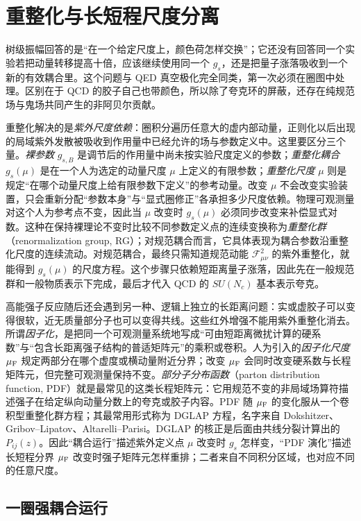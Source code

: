 \section{重整化与长短程尺度分离}\label{sec:qcd-running-ir-dp10}

树级振幅回答的是“在一个给定尺度上，颜色荷怎样交换”；它还没有回答同一个实验若把动量转移提高十倍，应该继续使用同一个 $g_s$，还是把量子涨落吸收到一个新的有效耦合里。这个问题与 QED 真空极化完全同类，第一次必须在圈图中处理。区别在于 QCD 的胶子自己也带颜色，所以除了夸克环的屏蔽，还存在纯规范场与鬼场共同产生的非阿贝尔贡献。

重整化解决的是\emph{紫外尺度依赖}：圈积分遍历任意大的虚内部动量，正则化以后出现的局域紫外发散被吸收到作用量中已经允许的场与参数定义中。这里要区分三个量。\emph{裸参数} $g_{s,B}$ 是调节后的作用量中尚未按实验尺度定义的参数；\emph{重整化耦合} $g_s(\mu)$ 是在一个人为选定的动量尺度 $\mu$ 上定义的有限参数；\emph{重整化尺度} $\mu$ 则是规定“在哪个动量尺度上给有限参数下定义”的参考动量。改变 $\mu$ 不会改变实验装置，只会重新分配“参数本身”与“显式圈修正”各承担多少尺度依赖。物理可观测量对这个人为参考点不变，因此当 $\mu$ 改变时 $g_s(\mu)$ 必须同步改变来补偿显式对数。这种在保持裸理论不变时比较不同参数定义点的连续变换称为\emph{重整化群}（renormalization group, RG）；对规范耦合而言，它具体表现为耦合参数沿重整化尺度的连续流动。对规范耦合，最终只需知道规范动能 $\mathcal F_{\mu\nu}^2$ 的紫外重整化，就能得到 $g_s(\mu)$ 的尺度方程。这个步骤只依赖短距离量子涨落，因此先在一般规范群和一般物质表示下完成，最后才代入 QCD 的 $SU(N_c)$ 基本表示夸克。

高能强子反应随后还会遇到另一种、逻辑上独立的长距离问题：实或虚胶子可以变得很软，近无质量部分子也可以变得共线。这些红外增强不能用紫外重整化消去。所谓\emph{因子化}，是把同一个可观测量系统地写成“可由短距离微扰计算的硬系数”与“包含长距离强子结构的普适矩阵元”的乘积或卷积。人为引入的\emph{因子化尺度} $\mu_{\rm F}$ 规定两部分在哪个虚度或横动量附近分界；改变 $\mu_{\rm F}$ 会同时改变硬系数与长程矩阵元，但完整可观测量保持不变。\emph{部分子分布函数}（parton distribution function, PDF）就是最常见的这类长程矩阵元：它用规范不变的非局域场算符描述强子在给定纵向动量分数上的夸克或胶子内容。PDF 随 $\mu_{\rm F}$ 的变化服从一个卷积型重整化群方程；其最常用形式称为 DGLAP 方程，名字来自 Dokshitzer、Gribov--Lipatov、Altarelli--Parisi。DGLAP 的核正是后面由共线分裂计算出的 $P_{ij}(z)$。因此“耦合运行”描述紫外定义点 $\mu$ 改变时 $g_s$ 怎样变，“PDF 演化”描述长短程分界 $\mu_{\rm F}$ 改变时强子矩阵元怎样重排；二者来自不同积分区域，也对应不同的任意尺度。

\subsection{一圈强耦合运行}

